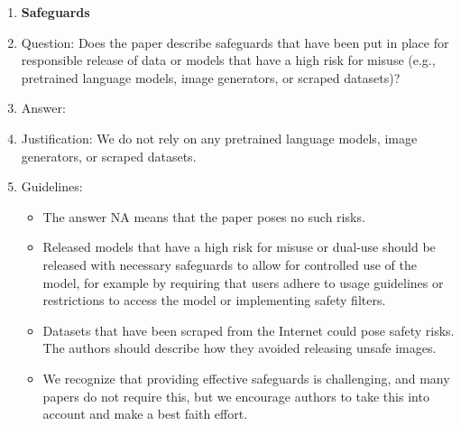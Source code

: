 \documentclass{article} %
\newcounter{ct}
\theoremstyle{definition}
\theoremstyle{remark}
\begin{document}
\begin{enumerate}
\item {\bf Safeguards}
    \item[] Question: Does the paper describe safeguards that have been put in place for responsible release of data or models that have a high risk for misuse (e.g., pretrained language models, image generators, or scraped datasets)?
    \item[] Answer: \answerNA{} %
    \item[] Justification: We do not rely on any pretrained language models, image generators, or scraped datasets.
    \item[] Guidelines:
    \begin{itemize}
        \item The answer NA means that the paper poses no such risks.
        \item Released models that have a high risk for misuse or dual-use should be released with necessary safeguards to allow for controlled use of the model, for example by requiring that users adhere to usage guidelines or restrictions to access the model or implementing safety filters. 
        \item Datasets that have been scraped from the Internet could pose safety risks. The authors should describe how they avoided releasing unsafe images.
        \item We recognize that providing effective safeguards is challenging, and many papers do not require this, but we encourage authors to take this into account and make a best faith effort.
    \end{itemize}


\end{enumerate}
\end{document}
